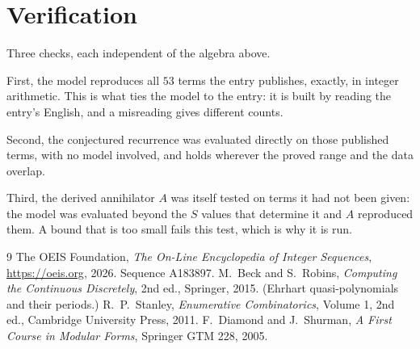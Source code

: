 \documentclass[11pt,a4paper]{article}
\theoremstyle{plain}
\theoremstyle{definition}
\begin{document}
\section{Verification}

Three checks, each independent of the algebra above.

First, the model reproduces all $53$ terms the entry publishes, exactly, in integer
arithmetic. This is what ties the model to the entry: it is built by reading the entry's
English, and a misreading gives different counts.

Second, the conjectured recurrence was evaluated directly on those published terms, with no
model involved, and holds wherever the proved range and the data overlap.

Third, the derived annihilator $A$ was itself tested on terms it had not been given: the model
was evaluated beyond the $S$ values that determine it and $A$ reproduced them. A bound that is
too small fails this test, which is why it is run.

\begin{thebibliography}{9}
 The OEIS Foundation, \emph{The On-Line Encyclopedia of Integer
Sequences}, \url{https://oeis.org}, 2026. Sequence A183897.
 M.~Beck and S.~Robins, \emph{Computing the Continuous Discretely},
2nd ed., Springer, 2015. (Ehrhart quasi-polynomials and their periods.)
 R.~P.~Stanley, \emph{Enumerative Combinatorics}, Volume 1, 2nd ed.,
Cambridge University Press, 2011.
 F.~Diamond and J.~Shurman, \emph{A First Course in Modular Forms},
Springer GTM 228, 2005.
\end{thebibliography}
\end{document}
